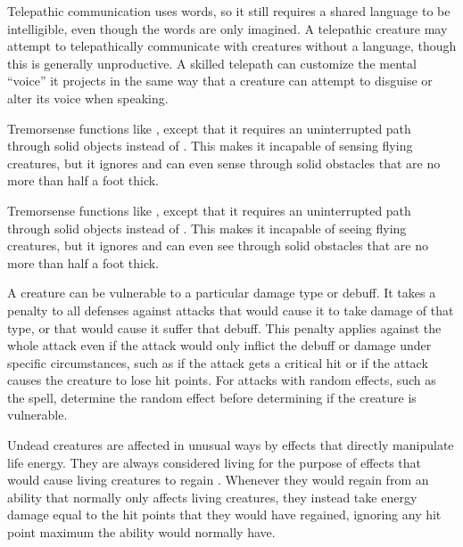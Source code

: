         Telepathic communication uses words, so it still requires a shared language to be intelligible, even though the words are only imagined.
        A telepathic creature may attempt to telepathically communicate with creatures without a language, though this is generally unproductive.
        A skilled telepath can customize the mental ``voice'' it projects in the same way that a creature can attempt to disguise or alter its voice when speaking.

        Tremorsense functions like , except that it requires an uninterrupted path through solid objects instead of .
        This makes it incapable of sensing flying creatures, but it ignores  and can even sense through solid obstacles that are no more than half a foot thick.

        Tremorsense functions like , except that it requires an uninterrupted path through solid objects instead of .
        This makes it incapable of seeing flying creatures, but it ignores  and can even see through solid obstacles that are no more than half a foot thick.

        A creature can be vulnerable to a particular damage type or debuff.
        It takes a  penalty to all defenses against attacks that would cause it to take damage of that type, or that would cause it suffer that debuff.
        This penalty applies against the whole attack even if the attack would only inflict the debuff or damage under specific circumstances, such as if the attack gets a critical hit or if the attack causes the creature to lose hit points.
        For attacks with random effects, such as the  spell, determine the random effect before determining if the creature is vulnerable.

        Undead creatures are affected in unusual ways by effects that directly manipulate life energy.
        They are always considered living  for the purpose of effects that would cause living creatures to regain .
        Whenever they would regain  from an ability that normally only affects living creatures, they instead take energy damage equal to the hit points that they would have regained, ignoring any hit point maximum the ability would normally have.

